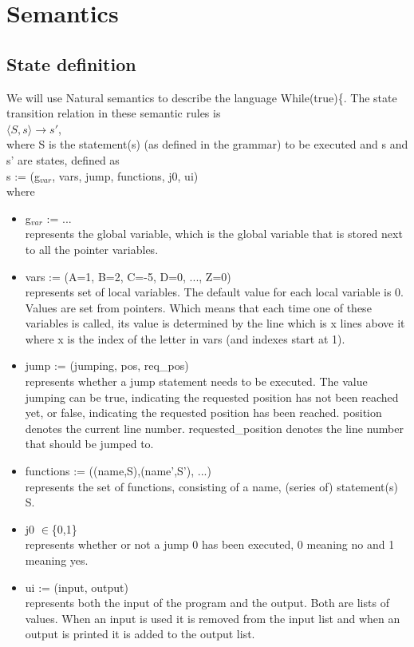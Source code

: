 \documentclass{article}
\begin{document}
\section{Semantics}
\subsection{State definition}
We will use Natural semantics to describe the language While(true)\{. 
The state transition relation in these semantic rules is\\

$\langle S, s \rangle \rightarrow s'$, \\

where S is the statement(s) (as defined in the grammar) to be executed and s and s' are states, defined as\\

s := (g$_{var}$, vars, jump, functions, j0, ui)\\

where
\begin{itemize}
    \item g$_{var}$ := ...\\ represents the global variable, which is the global variable that is stored next to all the pointer variables. 
    \item vars := (A=1, B=2, C=-5, D=0, ..., Z=0)\\ represents set of local variables. The default value for each local variable is 0. Values are set from pointers. Which means that each time one of these variables is called, its value is determined by the line which is x lines above it where x is the index of the letter in vars (and indexes start at 1).
    \item jump := (jumping, pos, req\_pos)\\ represents whether a jump statement needs to be executed. The value jumping can be true, indicating the requested position has not been reached yet, or false, indicating the requested position has been reached. position denotes the current line number. requested\_position denotes the line number that should be jumped to.
    \item functions := ((name,S),(name',S'), ...)\\ represents the set of functions, consisting of a name, (series of) statement(s) S.
    \item j0 $\in$\{0,1\}\\
    represents whether or not a jump 0 has been executed, 0 meaning no and 1 meaning yes.
    \item ui := (input, output)\\
    represents both the input of the program and the output. Both are lists of values. When an input is used it is removed from the input list and when an output is printed it is added to the output list.
\end{itemize}
\end{document}

